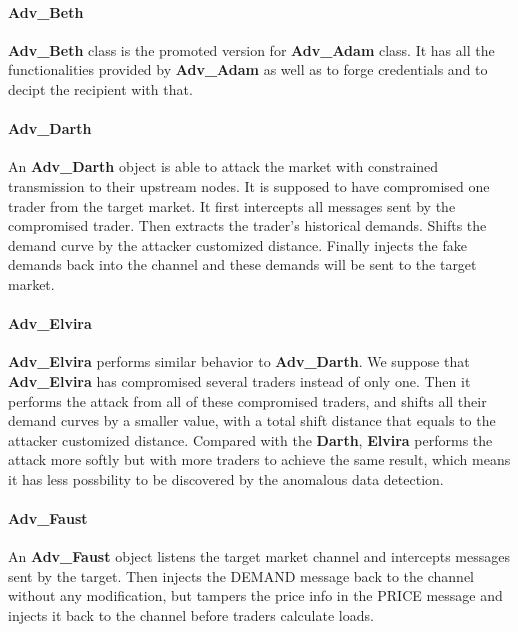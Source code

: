 \documentclass[12pt]{article}
\begin{document}
\paragraph{Adv\_Beth} \mbox{}

\textbf{Adv\_Beth} class is the promoted version for \textbf{Adv\_Adam} class. It has all 
the functionalities provided by \textbf{Adv\_Adam} as well as to forge credentials 
and to decipt the recipient with that.

\paragraph{Adv\_Darth} \mbox{}

An \textbf{Adv\_Darth} object is able to attack the market with constrained transmission 
to their upstream nodes. It is supposed to have compromised one trader from the 
target market. It first intercepts all messages sent by the compromised trader. 
Then extracts the trader's historical demands. Shifts the demand curve by the attacker 
customized distance. Finally injects the fake demands back into the channel and these 
demands will be sent to the target market. 

\paragraph{Adv\_Elvira} \mbox{}

\textbf{Adv\_Elvira} performs similar behavior to \textbf{Adv\_Darth}. We suppose that \textbf{Adv\_Elvira}
has compromised several traders instead of only one. Then it performs the attack from 
all of these compromised traders, and shifts all their demand curves by a smaller value, 
with a total shift distance that equals to the attacker customized distance. Compared 
with the \textbf{Darth}, \textbf{Elvira} performs the attack more softly but with more traders to achieve 
the same result, which means it has less possbility to be discovered by the anomalous data 
detection.

\paragraph{Adv\_Faust} \mbox{}

An \textbf{Adv\_Faust} object listens the target market channel and intercepts messages 
sent by the target. Then injects the DEMAND message back to the channel without any
modification, but tampers the price info in the PRICE message and injects it back 
to the channel before traders calculate loads. 
\end{document}
